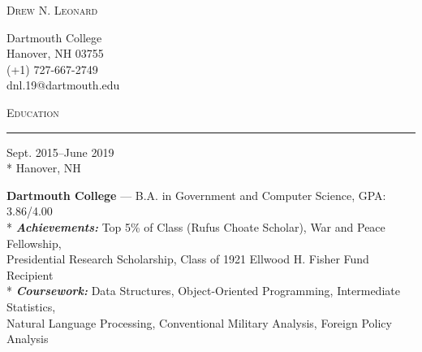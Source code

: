 \documentclass[a4paper,9pt]{article}
\begin{document}
\begin{minipage}[b]{0.70\linewidth}
	{\fontsize{32}{38}\selectfont \textsc{Drew N. Leonard}}
\end{minipage}
\begin{minipage}[b]{0.25\linewidth}
	\begin{flushright}
		\begin{small}
			Dartmouth College
			\\[0.25ex]
			Hanover, NH 03755
			\\[0.25ex]
			(+1) 727-667-2749
			\\[0.25ex]
			dnl.19@dartmouth.edu
			\\[0.25ex]
		\end{small}
	\end{flushright}
\end{minipage}

\vspace*{25pt}
\begin{Large}
	\textsc{Education}
\end{Large}
\vspace*{5pt}
\hrule

\vspace{2ex}	
\begin{minipage}[t]{0.20\linewidth}
	\begin{small}
		\begin{spacing}{1.00}
			\begin{flushright}
				Sept. 2015--June 2019
				\\*
				\vspace*{2.5pt}
				Hanover, NH
			\end{flushright}
		\end{spacing}
	\end{small}
\end{minipage}
\hspace{4mm}
\begin{minipage}[t]{0.75\linewidth}
	\begin{small}
		\begin{spacing}{1.00}
			\begin{flushleft}
				\textbf{Dartmouth College} --- B.A. in Government and Computer Science, GPA: 3.86/4.00
				\\*
				\vspace*{2.5pt} \textit{\textbf{Achievements:}} Top 5\% of Class (Rufus Choate Scholar), War and Peace Fellowship,\\ Presidential Research Scholarship, Class of 1921 Ellwood H. Fisher Fund Recipient  
				\\*
				\vspace*{2.5pt}
				\textit{\textbf{Coursework:}} Data Structures, Object-Oriented Programming, Intermediate Statistics,
                \\ Natural Language Processing, Conventional Military Analysis, Foreign Policy Analysis
			\end{flushleft}
		\end{spacing}
	\end{small}
\end{minipage}
\end{document}
